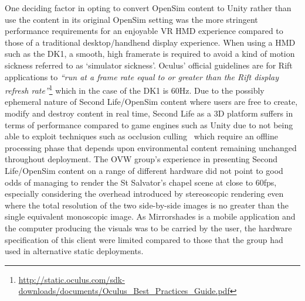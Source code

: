 One deciding factor in opting to convert OpenSim content to Unity rather than use the content in its original OpenSim setting was the more stringent performance requirements for an enjoyable VR HMD experience compared to those of a traditional desktop/handhend display experience. When using a HMD such as the DK1, a smooth, high framerate is required to avoid a kind of motion sickness referred to as `simulator sickness'. Oculus' official guidelines are for Rift applications to \textit{``run at a frame rate equal to or greater than the Rift display refresh rate''}\footnote{\url{http://static.oculus.com/sdk-downloads/documents/Oculus_Best_Practices_Guide.pdf}} which in the case of the DK1 is 60Hz. Due to the possibly ephemeral nature of Second Life/OpenSim content where users are free to create, modify and destroy content in real time, Second Life as a 3D platform suffers in terms of performance compared to game engines such as Unity due to not being able to exploit techniques such as occlusion culling~\cite{willmott:largecomplex} which require an offline processing phase that depends upon environmental content remaining unchanged throughout deployment. The OVW group's experience in presenting Second Life/OpenSim content on a range of different hardware did not point to good odds of managing to render the St Salvator's chapel scene at close to 60fps, especially considering the overhead introduced by stereoscopic rendering even where the total resolution of the two side-by-side images is no greater than the single equivalent monoscopic image. As Mirrorshades is a mobile application and the computer producing the visuals was to be carried by the user, the hardware specification of this client were limited compared to those that the group had used in alternative static deployments.


